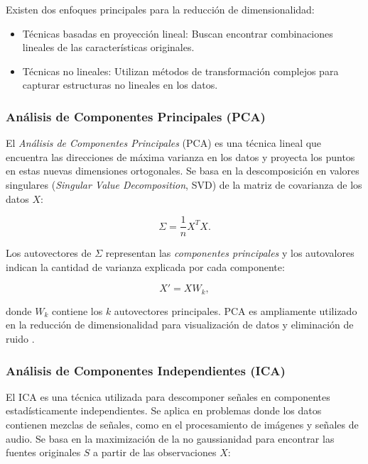 \begin{itemize}
		Existen dos enfoques principales para la reducción de dimensionalidad:
		
		\begin{itemize}
			\item Técnicas basadas en proyección lineal: Buscan encontrar combinaciones lineales de las características originales.
			\item Técnicas no lineales: Utilizan métodos de transformación complejos para capturar estructuras no lineales en los datos.
		\end{itemize}
		
		\subsubsection{Análisis de Componentes Principales (PCA)}
		
		El \textit{Análisis de Componentes Principales} (PCA) es una técnica lineal que encuentra las direcciones de máxima varianza en los datos y proyecta los puntos en estas nuevas dimensiones ortogonales. Se basa en la descomposición en valores singulares (\textit{Singular Value Decomposition}, SVD) de la matriz de covarianza de los datos \( X \):
		
		\begin{equation}
			\Sigma = \frac{1}{n} X^T X.
		\end{equation}
		
		Los autovectores de \( \Sigma \) representan las \textit{componentes principales} y los autovalores indican la cantidad de varianza explicada por cada componente:
		
		\begin{equation}
			X' = X W_k,
		\end{equation}
		
		donde \( W_k \) contiene los \( k \) autovectores principales. PCA es ampliamente utilizado en la reducción de dimensionalidad para visualización de datos y eliminación de ruido \cite{bishop2006pattern}.
		
		\subsubsection{Análisis de Componentes Independientes (ICA)}
		
		El ICA es una técnica utilizada para descomponer señales en componentes estadísticamente independientes. Se aplica en problemas donde los datos contienen mezclas de señales, como en el procesamiento de imágenes y señales de audio. Se basa en la maximización de la no gaussianidad para encontrar las fuentes originales \( S \) a partir de las observaciones \( X \):
		

\end{itemize}
